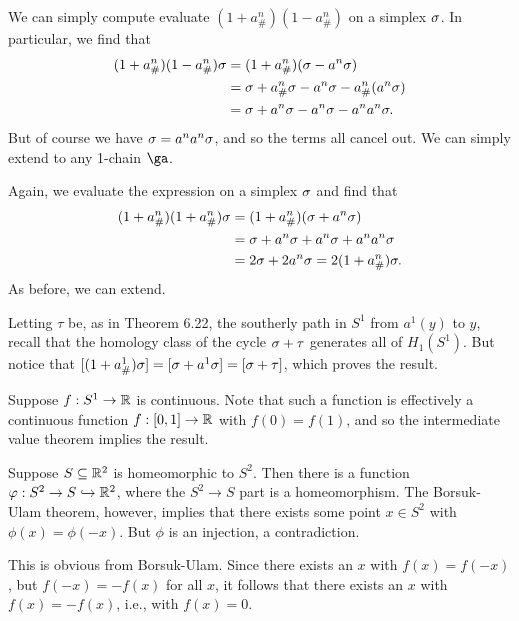 \documentclass[../../solutions.tex]{subfiles}
\begin{document}
\begin{exercise} \leavevmode
We can simply compute evaluate $(1+a^n_\#)(1-a^n_\#)$ on a simplex $\sigma$.
In particular, we find that
\begin{align*}
(1+a^n_\#)(1-a^n_\#)\sigma &= (1+a^n_\#)(\sigma-a^n\sigma) \\
&= \sigma + a^n_\#\sigma - a^n\sigma - a^n_\#(a^n\sigma) \\
&= \sigma + a^n\sigma - a^n\sigma - a^na^n\sigma.
\end{align*}
But of course we have $\sigma=a^na^n\sigma$, and so the terms all cancel out.
We can simply extend to any 1-chain $\ga$.
\end{exercise}

\begin{exercise} \leavevmode
Again, we evaluate the expression on a simplex $\sigma$ and find that
\begin{align*}
(1+a^n_\#)(1+a^n_\#)\sigma &= (1+a^n_\#)(\sigma+a^n\sigma) \\
&= \sigma+a^n\sigma+a^n\sigma+a^na^n\sigma \\
&= 2\sigma + 2a^n\sigma = 2(1+a^n_\#)\sigma.
\end{align*}
As before, we can extend.
\end{exercise}

\begin{exercise} \leavevmode
Letting $\tau$ be, as in Theorem 6.22, the southerly path in $S^1$ from $a^1(y)$ to $y$, recall that the homology class of the cycle $\sigma+\tau$ generates all of $H_1(S^1)$.
But notice that $[(1+a^1_\#)\sigma]=[\sigma+a^1\sigma]=[\sigma+\tau]$, which proves the result.
\end{exercise}

\begin{exercise} \leavevmode
Suppose $f:S^1\to\mathbb{R}$ is continuous.
Note that such a function is effectively a continuous function $f:[0,1]\to\mathbb{R}$ with $f(0)=f(1)$, and so the intermediate value theorem implies the result.
\end{exercise}

\begin{exercise} \leavevmode
Suppose $S\subseteq\mathbb{R}^2$ is homeomorphic to $S^2$.
Then there is a function $\varphi:S^2\to S\hookrightarrow\mathbb{R}^2$, where the $S^2\to S$ part is a homeomorphism.
The Borsuk-Ulam theorem, however, implies that there exists some point $x\in S^2$ with $\phi(x)=\phi(-x)$.
But $\phi$ is an injection, a contradiction.
\end{exercise}

\begin{exercise} \leavevmode
This is obvious from Borsuk-Ulam.
Since there exists an $x$ with $f(x)=f(-x)$, but $f(-x)=-f(x)$ for all $x$, it follows that there exists an $x$ with $f(x)=-f(x)$, i.e., with $f(x)=0$.
\end{exercise}
\end{document}
